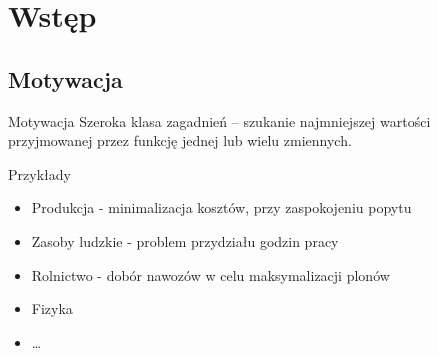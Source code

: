 \section{Wstęp}

\subsection{Motywacja}

  \begin{frame}{Motywacja}
    Szeroka klasa zagadnień -- szukanie najmniejszej wartości
    przyjmowanej przez funkcję jednej lub wielu zmiennych.

    \begin{exampleblock}{Przykłady}
      \begin{itemize}
        \item Produkcja - minimalizacja kosztów, przy zaspokojeniu popytu
        \item Zasoby ludzkie - problem przydziału godzin pracy
        \item Rolnictwo - dobór nawozów w celu maksymalizacji plonów
        \item Fizyka 
        \item \ldots
      \end{itemize}
    \end{exampleblock}
  \end{frame}


